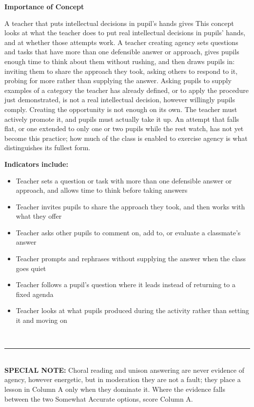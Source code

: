 \documentclass[10pt,a4paper]{article}
\newcommand{\twopane}[2]{%
  \noindent
  \begin{minipage}[t]{0.475\linewidth}\RaggedRight
    {\bfseries\small Importance of Concept}\\[1.4mm]
    \footnotesize #1 \normalsize
  \end{minipage}\hfill
  \begin{minipage}[t]{0.475\linewidth}\RaggedRight
    {\bfseries\small Indicators include:}\\[0.6mm]
    #2
  \end{minipage}\\[2mm]}
\newcommand{\specialnote}[1]{%
  \noindent\textcolor{trule}{\rule{\linewidth}{0.4pt}}\\[1.2mm]
  {\footnotesize\textbf{SPECIAL NOTE:} #1}\\[2mm]}
\begin{document}
\twopane{%

A teacher that puts intellectual decisions in pupil's hands gives 
This concept looks at what the teacher does to put real intellectual decisions in pupils' hands, and at
whether those attempts work. A teacher creating agency sets questions and tasks that have more than one
defensible answer or approach, gives pupils enough time to think about them without rushing, and then draws
pupils in: inviting them to share the approach they took, asking others to respond to it, probing for more
rather than supplying the answer. Asking pupils to supply examples of a category the teacher has already
defined, or to apply the procedure just demonstrated, is not a real intellectual decision, however willingly
pupils comply. Creating the opportunity is not enough on its own. The teacher must actively promote it, and
pupils must actually take it up.  An attempt that falls flat, or one extended to only one or two pupils while
the rest watch, has not yet become this practice; how much of the class is enabled to exercise agency is what
distinguishes its fullest form.%
}{%
\footnotesize
\begin{itemize}
  \item Teacher sets a question or task with more than one defensible answer or approach, and allows time to
        think before taking answers
  \item Teacher invites pupils to share the approach they took, and then works with what they offer
  \item Teacher asks other pupils to comment on, add to, or evaluate a classmate's answer
  \item Teacher prompts and rephrases without supplying the answer when the class goes quiet
  \item Teacher follows a pupil's question where it leads instead of returning to a fixed agenda
  \item Teacher looks at what pupils produced during the activity rather than setting it and moving on
\end{itemize}
\normalsize
}
 
\specialnote{Choral reading and unison answering are never evidence of agency, however energetic, but in
moderation they are not a fault; they place a lesson in Column A only when they dominate it. Where the
evidence falls between the two Somewhat Accurate options, score Column A.}
 
\end{document}
